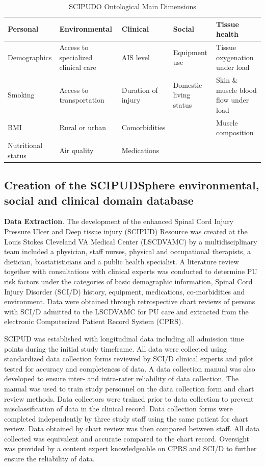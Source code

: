 \documentclass{amia}
\begin{document}
\begin{table}
  \begin{tabularx}{\textwidth}{|l|X|l|X|X|}
    \hline
    \textbf{Personal}  & \textbf{Environmental} & \textbf{Clinical} & \textbf{Social} & \textbf{Tissue health} \\ \hline
    Demographics  &  Access to specialized clinical care & AIS level & Equipment use & Tissue oxygenation under load \\ \hline
    Smoking       & Access to transportation & Duration of injury & Domestic living status & Skin \& muscle blood flow under load \\ \hline
    BMI  &  Rural or urban  & Comorbidities & & Muscle composition \\ \hline
    Nutritional status & Air quality & Medications & & \\ \hline
  \end{tabularx}
  \caption{SCIPUDO Ontological Main Dimensions}
  \label{ontology}
\end{table}

\subsection{Creation of the SCIPUDSphere environmental, social and clinical domain database}

{\bf Data Extraction}. The development of the enhanced Spinal Cord Injury Pressure Ulcer and Deep tissue injury (SCIPUD) Resource was created at the Louis Stokes Cleveland VA Medical Center (LSCDVAMC) by a multidisciplinary team included a physician, staff nurses, physical and occupational therapists, a dietician, biostatisticians and a public health specialist. A literature review \cite{literature_review} together with consultations with clinical experts was conducted to determine PU risk factors under the categories of basic demographic information, Spinal Cord Injury Disorder (SCI/D) history, equipment, medications, co-morbidities and environment. Data were obtained through retrospective chart reviews of persons with SCI/D admitted to the LSCDVAMC for PU care and extracted from the electronic Computerized Patient Record System (CPRS).

SCIPUD was established with longitudinal data including all admission time points during the initial study timeframe. All data were collected using standardized data collection forms reviewed by SCI/D clinical experts and pilot tested for accuracy and completeness of data. A data collection manual was also developed to ensure inter- and intra-rater reliability of data collection. The manual was used to train study personnel on the data collection form and chart review methods. Data collectors were trained prior to data collection to prevent misclassification of data in the clinical record. Data collection forms were completed independently by three study staff using the same patient for chart review. Data obtained by chart review was then compared between staff. All data collected was equivalent and accurate compared to the chart record. Oversight was provided by a content expert knowledgeable on CPRS and SCI/D to further ensure the reliability of data.
\end{document}
